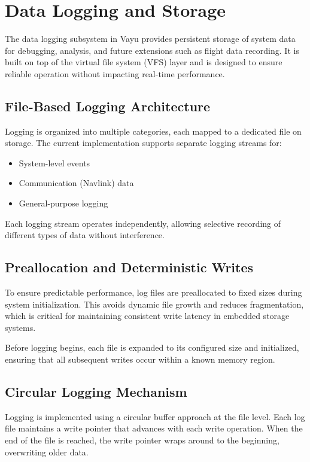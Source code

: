 \section{Data Logging and Storage}
\label{sec:vayu_logging}

The data logging subsystem in Vayu provides persistent storage of system data for debugging, analysis, and future extensions such as flight data recording. It is built on top of the virtual file system (VFS) layer and is designed to ensure reliable operation without impacting real-time performance.

\subsection{File-Based Logging Architecture}

Logging is organized into multiple categories, each mapped to a dedicated file on storage. The current implementation supports separate logging streams for:
\begin{itemize}
    \item System-level events
    \item Communication (Navlink) data
    \item General-purpose logging
\end{itemize}

Each logging stream operates independently, allowing selective recording of different types of data without interference.

\subsection{Preallocation and Deterministic Writes}

To ensure predictable performance, log files are preallocated to fixed sizes during system initialization. This avoids dynamic file growth and reduces fragmentation, which is critical for maintaining consistent write latency in embedded storage systems.

Before logging begins, each file is expanded to its configured size and initialized, ensuring that all subsequent writes occur within a known memory region.

\subsection{Circular Logging Mechanism}

Logging is implemented using a circular buffer approach at the file level. Each log file maintains a write pointer that advances with each write operation. When the end of the file is reached, the write pointer wraps around to the beginning, overwriting older data.

